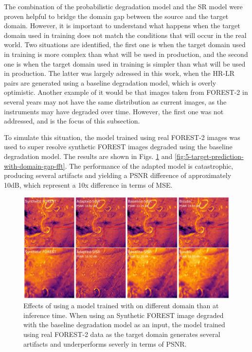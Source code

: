         The combination of the probabilistic degradation model and the SR model were proven helpful to bridge the domain gap between the source and the target domain.
        However, it is important to understand what happens when the target domain used in training does not match the conditions that will occur in the real world.
        Two situations are identified, the first one is when the target domain used in training is more complex than what will be used in production, and the second one is when the target domain used in training is simpler than what will be used in production.
        The latter was largely adressed in this work, when the HR-LR pairs are generated using a baseline degradation model, which is overly optimistic. 
        Another example of it would be that images taken from FOREST-2 in several years may not have the same distribution as current images, as the instruments may have degraded over time.
        However, the first one was not addressed, and is the focus of this subsection.
        
        To simulate this situation, the model trained using real FOREST-2 images was used to super resolve synthetic FOREST images degraded using the baseline degradation model.
        The results are shown in Figs. \ref{fig:5-target-prediction-with-domain-gap} and \ref{fig:5-target-prediction-with-domain-gap-fft}.
        The performance of the adapted model is catastrophic, producing several artifacts and yielding a PSNR difference of approximately 10dB, which represent a 10x difference in terms of MSE.

        \begin{figure}[H]
            \centering
            \includegraphics[scale=0.28]{Includes/5-target-prediction-with-domain-gap.pdf}
            \caption{Effects of using a model trained with on different domain than at inference time. 
                     When using an Synthetic FOREST image degraded with the baseline degradation model as an input, the model trained using real FOREST-2 data as the target domain generates several artifacts and underperforms severly in terms of PSNR. }
            \label{fig:5-target-prediction-with-domain-gap}
        \end{figure}

